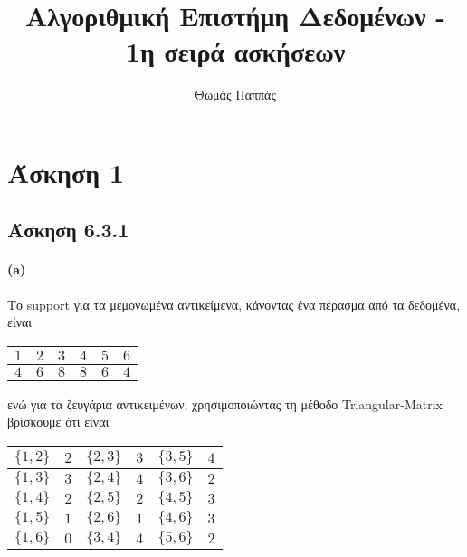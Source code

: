 \documentclass[a4paper,11pt]{article}
\begin{document}
\title{Αλγοριθμική Επιστήμη Δεδομένων - 1η σειρά ασκήσεων}
\author{Θωμάς Παππάς}
\maketitle

\section*{Άσκηση 1}

\subsection*{Άσκηση 6.3.1}

\paragraph{(a)} Το support για τα μεμονωμένα αντικείμενα, κάνοντας ένα πέρασμα από τα δεδομένα, είναι
\begin{center}
	\begin{tabular}{| c | c | c | c | c | c |}
		\hline
		$1$ & $2$ & $3$ & $4$ & $5$ & $6$ \\
		\hline
		$4$ & $6$ & $8$ & $8$ & $6$ & $4$ \\
		\hline
	\end{tabular}
\end{center}

ενώ για τα ζευγάρια αντικειμένων, χρησιμοποιώντας τη μέθοδο Triangular-Matrix βρίσκουμε ότι είναι
\begin{center}
	\begin{tabular}{| c | c || c | c || c | c |}
		\hline
		$\{1,2\}$ & $2$ & $\{2,3\}$ & $3$ &$\{3,5\}$ & $4$ \\
		\hline
		$\{1,3\}$ & $3$ & $\{2,4\}$ & $4$ &$\{3,6\}$ & $2$ \\
		\hline
		$\{1,4\}$ & $2$ & $\{2,5\}$ & $2$ &$\{4,5\}$ & $3$ \\
		\hline
		$\{1,5\}$ & $1$ & $\{2,6\}$ & $1$ &$\{4,6\}$ & $3$ \\
		\hline
		$\{1,6\}$ & $0$ & $\{3,4\}$ & $4$ &$\{5,6\}$ & $2$ \\
		\hline
	\end{tabular}
\end{center}
\end{document}

